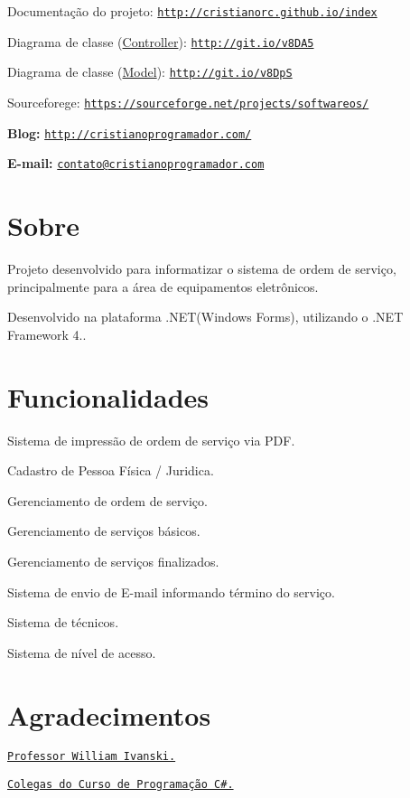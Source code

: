Documentação do projeto\+: \href{http://cristianorc.github.io/index}{\tt http\+://cristianorc.\+github.\+io/index}

Diagrama de classe (\hyperlink{namespace_controller}{Controller})\+: \href{http://git.io/v8DA5}{\tt http\+://git.\+io/v8\+D\+A5}

Diagrama de classe (\hyperlink{namespace_model}{Model})\+: \href{http://git.io/v8DpS}{\tt http\+://git.\+io/v8\+Dp\+S}

Sourceforege\+: \href{https://sourceforge.net/projects/softwareos/}{\tt https\+://sourceforge.\+net/projects/softwareos/}

{\bfseries Blog\+:} \href{http://cristianoprogramador.com/}{\tt http\+://cristianoprogramador.\+com/}

{\bfseries E-\/mail\+:} \href{mailto:contato@cristianoprogramador.com}{\tt contato@cristianoprogramador.\+com}

\section*{Sobre }

Projeto desenvolvido para informatizar o sistema de ordem de serviço, principalmente para a área de equipamentos eletrônicos.

Desenvolvido na plataforma .N\+E\+T(\+Windows Forms), utilizando o .N\+E\+T Framework 4..

\section*{Funcionalidades }


\begin{DoxyItemize}
\item Sistema de impressão de ordem de serviço via P\+D\+F. 
\item Cadastro de Pessoa Física / Juridica. 
\item Gerenciamento de ordem de serviço. 
\item Gerenciamento de serviços básicos. 
\item Gerenciamento de serviços finalizados. 
\item Sistema de envio de E-\/mail informando término do serviço. 
\item Sistema de técnicos. 
\item Sistema de nível de acesso. 
\end{DoxyItemize}

\section*{Agradecimentos }

\href{http://williamivanski.com.br/}{\tt Professor William Ivanski.}

\href{https://plus.google.com/communities/102417267229322909418}{\tt Colegas do Curso de Programação C\#.} 